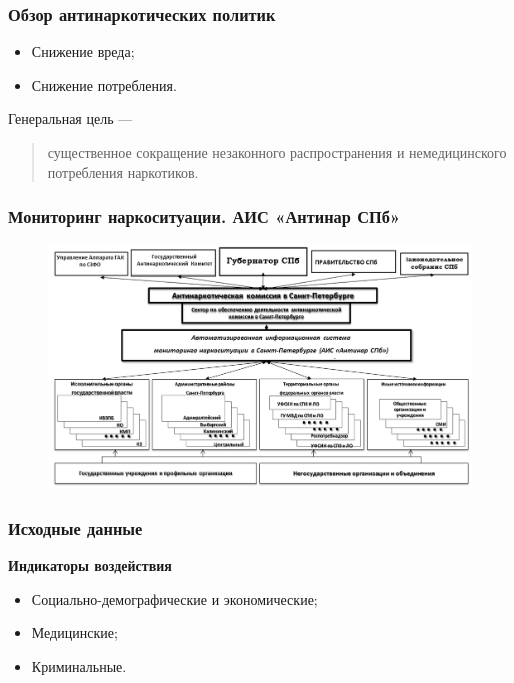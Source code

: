 \documentclass[t]{beamer}  %
\begin{document}
\begin{frame}
    \frametitle{Обзор антинаркотических политик}%
	\begin{itemize}
        \item Снижение вреда;
        \item Снижение потребления.
	\end{itemize}
    Генеральная цель ---
    \begin{quote}
        существенное сокращение незаконного распространения и немедицинского 
        потребления наркотиков. 
    \end{quote}
\end{frame}
\begin{frame}
    \frametitle{Мониторинг наркоситуации. АИС «Антинар СПб»}%
    \begin{figure}
        \centering
        \includegraphics[width=\textwidth]{org_mezhved_antinar.png}
    \end{figure}
\end{frame}
\begin{frame}
    \frametitle{Исходные данные}
    \textbf{Индикаторы воздействия}
    \begin{itemize}
    \item Социально-демографические и экономические;
    \item Медицинские;
    \item Криминальные.
    \end{itemize}
\end{frame}
\end{document}
